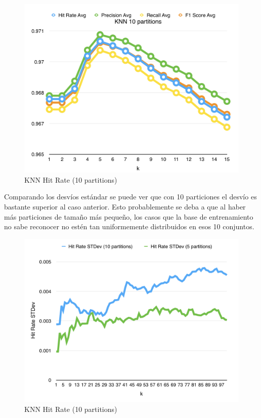 \newpage

\begin{figure}[h!]
  \begin{center}
	\includegraphics[scale=0.7]{exp1/KNN-10p-Scores.png}
	\caption{KNN Hit Rate (10 partitions)}
  \end{center}
\end{figure}

Comparando los desvíos estándar se puede ver que con 10 particiones el desvío es bastante superior al caso anterior. Esto probablemente se deba a que al haber más particiones de tamaño más pequeño, los casos que la base de entrenamiento no sabe reconocer no estén tan uniformemente distribuidos en esos 10 conjuntos.\\ 

\begin{figure}[h!]
  \begin{center}
	\includegraphics[scale=0.7]{exp1/KNN-Hit-Rate-stdev.png}
	\caption{KNN Hit Rate (10 partitions)}
  \end{center}
\end{figure}

